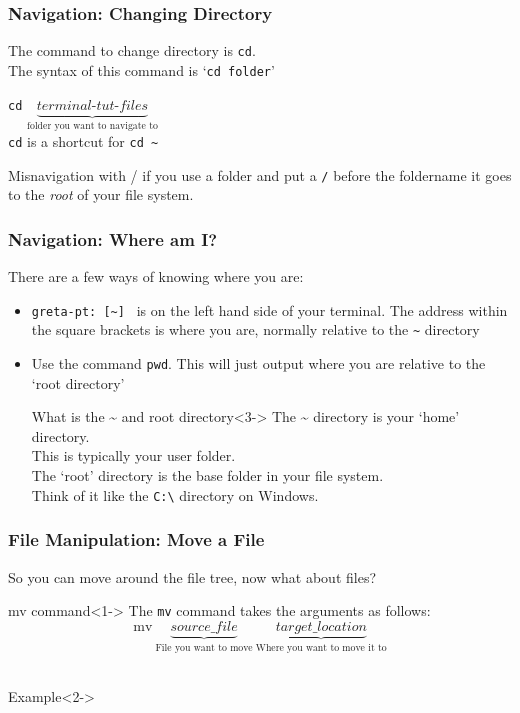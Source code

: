\documentclass{beamer}
\begin{document}
\begin{frame}[fragile]
    \frametitle{Navigation: Changing Directory}
    The command to change directory is \verb|cd|.\\
    The syntax of this command is `\verb|cd folder|'
    \begin{example}
        \verb|cd| $\underbrace{\textit{terminal-tut-files}}_\text{folder you
            want to navigate to}$\\
        \verb|cd| is a shortcut for \verb|cd ~|
    \end{example}
    \pause{}
    \begin{alertblock}{Misnavigation with /}
        if you use a folder and put a \verb|/| before the foldername it goes to
        the \textit{root} of your file system.
    \end{alertblock}
\end{frame}
\begin{frame}[fragile]
    \frametitle{Navigation: Where am I?}
    There are a few ways of knowing where you are:
    \begin{itemize}
        \item<1-> \verb|greta-pt: [~] | is on the left hand side of your
            terminal. The address within the square brackets is where you are,
            normally relative to the \verb|~| directory            
        \item<2->Use the command \verb|pwd|. This will just output where you are
            relative to the `root directory'
        \begin{alertblock}{What is the \textasciitilde{} and root  directory}<3->
            The \textasciitilde{} directory is your `home' directory.\\
            This is typically your user folder.\\
            The `root' directory is the base folder in your file system.\\
            Think of it like the \verb|C:\| directory on Windows.
        \end{alertblock}
    \end{itemize}
\end{frame}
\begin{frame}[fragile]
    \frametitle{File Manipulation: Move a File}
    So you can move around the file tree, now what about files?\\
    \begin{block}{mv command}<1->
        The \verb|mv| command takes the arguments as follows:\\
        $$\text{mv}\ \underbrace{\textit{source\_file}}_\text{File you want to move}\ \underbrace{\textit{target\_location}}_\text{Where you want to move it to}$$\\
    \end{block}
    \begin{example}{Example}<2->
        
    \end{example}
\end{frame}
\end{document}
